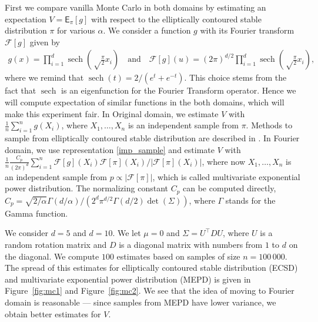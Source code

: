 \documentclass[preprint, 3p, authoryear]{elsarticle}
\newcommand{\E}{\mathsf{E}}
\newcommand{\T}{\top}
\newcommand{\sech}{\operatorname{sech}}
\theoremstyle{definition}
\begin{document}
First we compare vanilla Monte Carlo in both domains 
by estimating an expectation $V=\E_\pi[g]$ with respect to the elliptically contoured stable distribution
$\pi$ for various $\alpha$. We consider a function $g$ with its Fourier transform $\mathcal{F}[g]$ given by
\begin{align}\label{num:gfunc}
	g(x) = \prod_{i=1}^d \sech\left(\sqrt\frac{\pi}{2}x_i\right)
	\quad\text{and}\quad
	\mathcal{F}[g](u) = \left(2\pi\right)^{d/2}\prod_{i=1}^d \sech\left(\sqrt\frac{\pi}{2}x_i\right),
\end{align}
where we remind that $\sech(t) = 2/(e^{t}+e^{-t})$.
This choice stems from the fact that $\sech$ is an
eigenfunction for the Fourier Transform operator. 
Hence we will compute expectation of similar functions in 
the both domains, which will make this experiment fair.
In Original domain, we estimate $V$ with $\frac{1}{n}\sum_{i=1}^n g(X_i)$, 
where $X_1,\ldots,X_n$ is an independent sample from $\pi$. Methods to sample from 
elliptically contoured stable distribution are described in \cite{nolan2013}.
In Fourier domain, we use representation \eqref{imp_sample} and 
estimate $V$ with $\frac{1}{n}\frac{C_p}{(2\pi)^d}\sum_{i=1}^n \mathcal{F}[g](X_i)\mathcal{F}[\pi](X_i)/|\mathcal{F}[\pi](X_i)|$,
where now $X_1,\ldots,X_n$ is an independent sample from $p\propto|\mathcal{F}[\pi]|$,
which is called multivariate exponential power distribution.
The normalizing constant $C_p$ can be computed directly, $C_p=\sqrt{2/\alpha}\Gamma(d/\alpha)/(2^d \pi^{d/2}\Gamma(d/2) \det(\Sigma))$,
where $\Gamma$ stands for the Gamma function.
\par
We consider $d=5$ and $d=10$. %
We let $\mu=0$ and $\Sigma = U^\T D U$,
where $U$ is a random rotation matrix and $D$ is a diagonal matrix with numbers from $1$ to $d$ on the diagonal. 
We compute $100$ estimates based on samples  of size $n=100\,000$.
The spread of this estimates for elliptically contoured stable distribution (ECSD) and multivariate exponential power distribution (MEPD)
is given in Figure~\ref{fig:mc1} and Figure~\ref{fig:mc2}.
We see that the idea of moving to Fourier domain is reasonable ---
since samples from MEPD have lower variance, we obtain better estimates for $V$.
\end{document}
